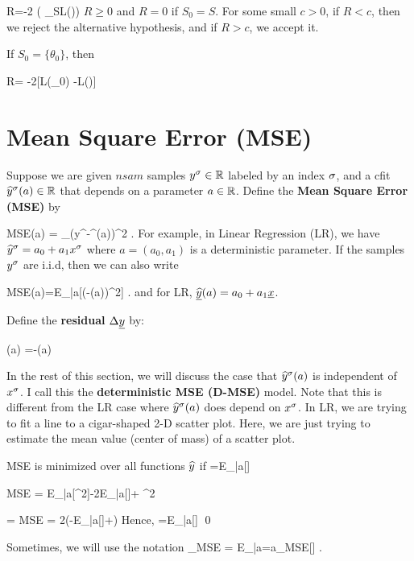 \beq
R=-2\ln
\left(
{\sup_{\theta\in S}L(\theta)}\right)
\eeq
$R\geq 0$ and $R=0$ if  $S_0=S$.
For some small $c>0$,
if $R<c$, then we reject the alternative hypothesis,
and if $R>c$, we accept it.




If $S_0=\{\theta_0\}$,
then

\beq
R= -2[\ln L(\theta_0) -\ln L(\HAT{\theta})]
\eeq


\section{Mean Square Error (MSE)}

Suppose we are
given $nsam$ samples $y^\sigma\in{ \mathbb{R}}$
labeled by an index $\sigma$,
and a cfit ${\widehat{y}}^\sigma(a)\in{ \mathbb{R}}$
that depends on a parameter $a\in{ \mathbb{R}}$.
Define the {\bf Mean Square
Error (MSE)}
by

\beq
MSE(a) = \sum_\s (y^\s-\haty^\s(a))^2
\;.
\eeq
For example, in Linear Regression (LR),
we have ${\widehat{y}}^\sigma= a_0 + a_1 x^\sigma$
where $a=(a_0, a_1)$ is a deterministic
parameter.
If the samples $y^\sigma$
are i.i.d,
then we can also write


\beq
MSE(a)=E_{|a}[(\rvy-\ul{\haty}(a))^2]
\;.
\eeq
and for LR, $\underline{{\widehat{y}}}(a)=a_0+a_1{\underline{x}}$.

Define the {\bf residual} $\Delta{\underline{y}}$ by:


\beq
\Delta\rvy(a) =\rvy-\ul{\haty}(a)
\;\;\;
\eeq

In the rest of this section,
we will discuss the case that
${\widehat{y}}^\sigma(a)$ is independent of $x^\sigma$.
I call
this the {\bf deterministic MSE (D-MSE)}
model.
Note that this
is different from the LR
case where
${\widehat{y}}^\sigma(a)$ does depend on $x^\sigma$.
In LR, we are trying
to fit
a line to a cigar-shaped
2-D scatter plot.
Here, we are just trying
to estimate
the mean value (center of mass)
of a scatter plot.


\begin{claim}
MSE is minimized
over all functions ${\widehat{y}}$ if
\beq
\haty =E_{|a}[\rvy]
\eeq
\end{claim}
\proof

\beq
MSE = E_{|a}[\rvy^2]-2\haty E_{|a}[\rvy]+ \haty^2
\eeq

= MSE = 2(-E_{|a}[\rvy]+\haty)
\eeq
Hence,
\beq
\haty =E_{|a}[\rvy]
\eeq
\qed

Sometimes, we will
use the notation
\beq
\haty_{MSE} = E_{|a=a_{MSE}}[\rvy]
\;.
\eeq

